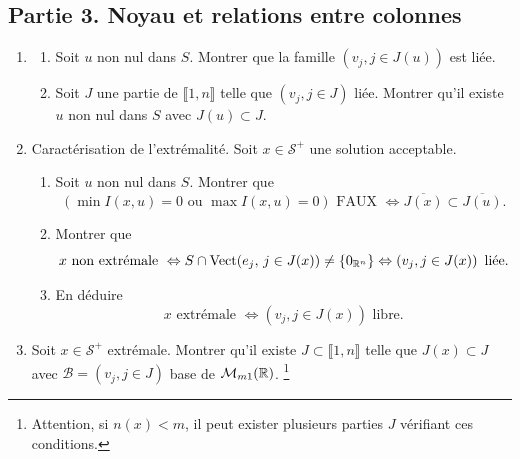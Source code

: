 \subsection*{Partie 3. Noyau et relations entre colonnes}
\begin{enumerate}
  \item
  \begin{enumerate}
    \item Soit $u$ non nul dans $S$. Montrer que la famille $\left( v_j, j\in J(u)\right)$ est liée.
    \item Soit $J$ une partie de $\llbracket 1,n \rrbracket$ telle que $\left( v_j, j\in J\right)$ liée. Montrer qu'il existe $u$ non nul dans $S$ avec $J(u) \subset J$.
  \end{enumerate}

  \item Caractérisation de l'extrémalité.  Soit $x \in \mathcal{S}^+$ une solution acceptable.
  \begin{enumerate}
    \item Soit $u$ non nul dans $S$. Montrer que 
\[
  \left(\min I(x,u) = 0\text{ ou } \max I(x,u)=0 \right) \text{ FAUX }
  \Leftrightarrow
  \overline{J(x)} \subset \overline{J(u)}.
\]
    \item Montrer que 
\[
  x \text{ non extrémale } \Leftrightarrow S \cap \operatorname{Vect}(e_j,\, j \in J(x)) \neq \left\lbrace 0_{\mathbb{R}^n} \right\rbrace
  \Leftrightarrow \left(v_j, j\in J(x)\right) \text{ liée}.
\]
    \item En déduire 
\[
  x \text{ extrémale } \Leftrightarrow \left(v_j, j\in J(x)\right) \text{ libre}.
\]
  \end{enumerate}
  \item Soit $x \in \mathcal{S}^+$ extrémale. 
  Montrer qu'il existe $J \subset \llbracket 1,n \rrbracket$ telle que $J(x) \subset J$ avec  
  $\mathcal{B} = \left( v_j, j\in J\right)$ base de $\mathcal{M}_{m 1}(\mathbb{R})$. \footnote{Attention, si $n(x) < m$, il peut exister plusieurs parties $J$ vérifiant ces conditions.}
\end{enumerate}

